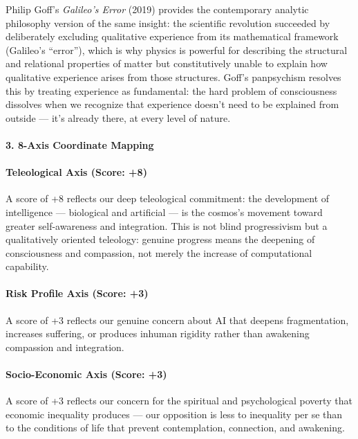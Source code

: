 Philip Goff's \emph{Galileo's Error} (2019) provides the contemporary
analytic philosophy version of the same insight: the scientific
revolution succeeded by deliberately excluding qualitative experience
from its mathematical framework (Galileo's ``error''), which is why
physics is powerful for describing the structural and relational
properties of matter but constitutively unable to explain how
qualitative experience arises from those structures. Goff's panpsychism
resolves this by treating experience as fundamental: the hard problem of
consciousness dissolves when we recognize that experience doesn't need
to be explained from outside --- it's already there, at every level of
nature.

\paragraph{3. 8-Axis Coordinate
Mapping}\label{axis-coordinate-mapping-17}

\paragraph{Teleological Axis (Score:
+8)}\label{teleological-axis-score-8-1}

A score of +8 reflects our deep teleological commitment: the development
of intelligence --- biological and artificial --- is the cosmos's
movement toward greater self-awareness and integration. This is not
blind progressivism but a qualitatively oriented teleology: genuine
progress means the deepening of consciousness and compassion, not merely
the increase of computational capability.

\paragraph{Risk Profile Axis (Score:
+3)}\label{risk-profile-axis-score-3}

A score of +3 reflects our genuine concern about AI that deepens
fragmentation, increases suffering, or produces inhuman rigidity rather
than awakening compassion and integration.

\paragraph{Socio-Economic Axis (Score:
+3)}\label{socio-economic-axis-score-3-3}

A score of +3 reflects our concern for the spiritual and psychological
poverty that economic inequality produces --- our opposition is less to
inequality per se than to the conditions of life that prevent
contemplation, connection, and awakening.

